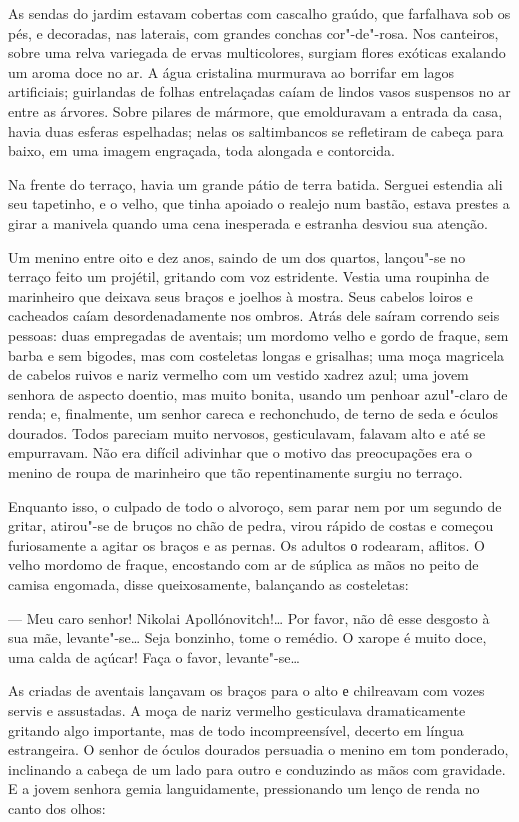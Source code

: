 As sendas do jardim estavam cobertas com cascalho graúdo, que farfalhava
sob os pés, e decoradas, nas laterais, com grandes conchas cor"-de"-rosa.
Nos canteiros, sobre uma relva variegada de ervas multicolores, surgiam
flores exóticas exalando um aroma doce no ar. A água cristalina
murmurava ao borrifar em lagos artificiais; guirlandas de folhas
entrelaçadas caíam de lindos vasos suspensos no ar entre as árvores. Sobre pilares de mármore, que emolduravam a entrada da casa, havia duas
esferas espelhadas; nelas os saltimbancos se refletiram de
cabeça para baixo, em uma imagem engraçada, toda alongada e contorcida.

Na frente do terraço, havia um grande pátio de terra batida. Serguei
estendia ali seu tapetinho, e o velho, que tinha apoiado o realejo num
bastão, estava prestes a girar a manivela quando uma cena inesperada e
estranha desviou sua atenção.

Um menino entre oito e dez anos, saindo de um dos quartos, lançou"-se no
terraço feito um projétil, gritando com voz estridente. Vestia uma
roupinha de marinheiro que deixava seus braços e joelhos à mostra. Seus
cabelos loiros e cacheados caíam desordenadamente nos ombros. Atrás dele
saíram correndo seis pessoas: duas empregadas de aventais; um mordomo velho e
gordo de fraque, sem barba e sem bigodes, mas com costeletas
longas e grisalhas; uma moça magricela de cabelos ruivos e nariz
vermelho com um vestido xadrez azul; uma jovem senhora de aspecto
doentio, mas muito bonita, usando um penhoar azul"-claro de renda; e,
finalmente, um senhor careca e rechonchudo, de terno de seda e óculos
dourados. Todos pareciam muito nervosos, gesticulavam, falavam alto e
até se empurravam. Não era difícil adivinhar que o motivo das
preocupações era o menino de roupa de marinheiro que tão repentinamente
surgiu no terraço.

Enquanto isso, o culpado de todo o alvoroço, sem parar nem por um
segundo de gritar, atirou"-se de bruços no chão de pedra, virou rápido de
costas e começou furiosamente a agitar os braços e as pernas. Os adultos
о rodearam, aflitos. O velho mordomo de fraque, encostando com ar de
súplica as mãos no peito de camisa engomada, disse queixosamente,
balançando as costeletas:

--- Meu caro senhor! Nikolai Apollónovitch!\ldots{} Por favor, não dê esse
desgosto à sua mãe, levante"-se\ldots{} Seja bonzinho, tome o remédio. O
xarope é muito doce, uma calda de açúcar! Faça o favor, levante"-se\ldots{}

As criadas de aventais lançavam os braços para o alto е chilreavam com
vozes servis e assustadas. A moça de nariz vermelho gesticulava
dramaticamente gritando algo importante, mas de todo incompreensível, decerto em língua estrangeira. O senhor de óculos
dourados persuadia o menino em tom ponderado, inclinando a cabeça de um
lado para outro e conduzindo as mãos com gravidade. E a jovem senhora
gemia languidamente, pressionando um lenço de renda no canto dos olhos:

